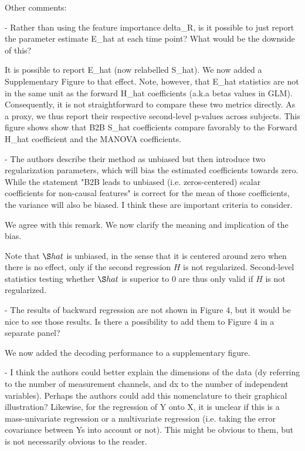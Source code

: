 Other comments:

- Rather than using the feature importance delta_R, is it possible to just
    report the parameter estimate E_hat at each time point? What would be the
    downside of this?

It is possible to report E_hat (now relabelled S_hat). We now added a Supplementary Figure
to that effect. Note, however, that E_hat statistics are not in the same unit as the forward H_hat
coefficients (a.k.a betas values in GLM). Consequently, it is not straightforward to
compare these two metrics directly. As a proxy, we thus report their respective
second-level p-values across subjects. This figure shows show that B2B S_hat
coefficients compare favorably to the Forward H_hat coefficient and the MANOVA coefficients.

- The authors describe their method as unbiased but then introduce two
    regularization parameters, which will bias the estimated coefficients towards
    zero. While the statement "B2B leads to unbiased (i.e. zeros-centered) scalar
    coefficients for non-causal features" is correct for the mean of those
    coefficients, the variance will also be biased. I think these are important
    criteria to consider.

We agree with this remark. We now clarify the meaning and implication of the bias.

Note that $\S hat$ is unbiased, in the sense that it is centered around zero when there is no
effect, only if the second regression $H$ is not regularized. Second-level
statistics testing whether $\S hat$ is superior to 0 are thus only valid if $H$
is not regularized.

- The results of backward regression are not shown in Figure 4, but it would be
    nice to see those results. Is there a possibility to add them to Figure 4 in a
    separate panel?

We now added the decoding performance to a supplementary figure.

- I think the authors could better explain the dimensions of the data (dy
    referring to the number of measurement channels, and dx to the number of
    independent variables). Perhaps the authors could add this nomenclature to their
    graphical illustration? Likewise, for the regression of Y onto X, it is unclear
    if this is a mass-univariate regression or a multivariate regression (i.e.
    taking the error covariance between Ys into account or not). This might be
    obvious to them, but is not necessarily obvious to the reader.

